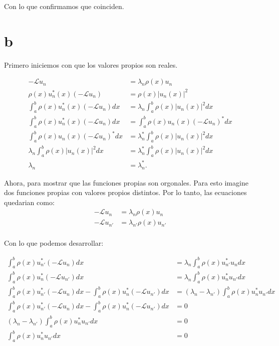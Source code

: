 \documentclass{report}
\newcommand{\Lagr}{\mathcal{L}}
\begin{document}
Con lo que confirmamos que coinciden.

\section{b}

Primero iniciemos con que los valores propios son reales.

\begin{align*}
-\Lagr u_n &= \lambda_n \rho(x) u_n\\
\rho(x) u_n^*(x) \left(-\Lagr u_n\right) &= \rho(x) \left|u_n(x)\right|^2 \\
\int_a^b \rho(x) u_n^*(x) \left(-\Lagr u_n\right) dx &= \lambda_n \int_a^b \rho(x) \left|u_n(x)\right|^2 dx \\
\int_a^b \rho(x) u_n^*(x) \left(-\Lagr u_n\right) dx &= \int_a^b \rho(x) u_n(x) \left(-\Lagr u_n\right)^* dx \\
\int_a^b \rho(x) u_n(x) \left(-\Lagr u_n\right)^* dx &= \lambda_n^* \int_a^b \rho(x) \left|u_n(x)\right|^2 dx \\
\lambda_n \int_a^b \rho(x) \left|u_n(x)\right|^2 dx &= \lambda_n^* \int_a^b \rho(x) \left|u_n(x)\right|^2 dx \\
\lambda_n &= \lambda_n^*
.\end{align*}

Ahora, para mostrar que las funciones propias son orgonales. Para esto imagine dos funciones propias con valores propios distintos. Por lo tanto, las ecuaciones quedarian como:
\begin{align*}
-\Lagr u_{n} &= \lambda_{n} \rho(x) u_{n}\\
-\Lagr u_{n'} &= \lambda_{n'} \rho(x) u_{n'}\\
\end{align*}

Con lo que podemos desarrollar:

\begin{align*}
\int_a^b \rho(x) u_{n'}^* (-\Lagr u_{n}) dx &= \lambda_{n} \int_a^b \rho(x) u_{n'}^* u_{n} dx\\
\int_a^b \rho(x) u_{n}^* (-\Lagr u_{n'}) dx &= \lambda_{n} \int_a^b \rho(x) u_{n}^* u_{n'} dx\\
\int_a^b \rho(x) u_{n'}^* (-\Lagr u_{n}) dx - \int_a^b \rho(x) u_{n}^* (-\Lagr u_{n'}) dx &= \left(\lambda_n - \lambda_{n'} \right) \int_a^b \rho(x) u_{n}^* u_{n'} dx \\
\int_a^b \rho(x) u_{n'}^* (-\Lagr u_{n}) dx - \int_a^b \rho(x) u_{n}^* (-\Lagr u_{n'}) dx &= 0\\
\left(\lambda_n - \lambda_{n'} \right) \int_a^b \rho(x) u_{n}^* u_{n'} dx &= 0\\
\int_a^b \rho(x) u_{n}^* u_{n'} dx &= 0
\end{align*}
\end{document}
